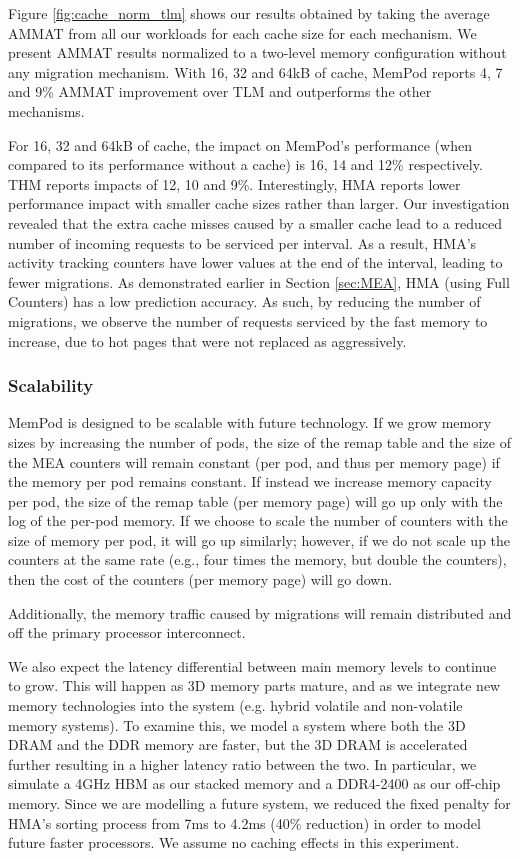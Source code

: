 Figure \ref{fig:cache_norm_tlm} shows our results obtained by taking the average AMMAT from all our workloads for each cache size for each mechanism. We present AMMAT results normalized to a two-level memory configuration without any migration mechanism. With 16, 32 and 64kB of cache, MemPod reports 4, 7 and 9\% AMMAT improvement over TLM and outperforms the other mechanisms.

For 16, 32 and 64kB of cache, the impact on MemPod's performance (when compared to its performance without a cache) is 16, 14 and 12\% respectively. THM reports impacts of 12, 10 and 9\%. Interestingly, HMA reports lower performance impact with smaller cache sizes rather than larger. Our investigation revealed that the extra cache misses caused by a smaller cache lead to a reduced number of incoming requests to be serviced per interval. As a result, HMA's activity tracking counters have lower values at the end of the interval, leading to fewer migrations. As demonstrated earlier in Section \ref{sec:MEA}, HMA (using Full Counters) has a low prediction accuracy. As such, by reducing the number of migrations, we observe the number of requests serviced by the fast memory to 
increase, due to hot pages that were not replaced as aggressively.

\subsubsection{Scalability}

MemPod is designed to be scalable with future technology.  If we grow memory
sizes by increasing the number of pods, the size of the remap table and the 
size of the MEA counters will remain constant (per pod, and thus per memory
page) if the memory per pod remains constant.  If instead we increase
memory capacity per pod, the size of the remap table (per memory page)
will go up only with the log of the per-pod memory. If we choose to scale
the number of counters with the size of memory per pod, it will go up
similarly; however, if we do not scale up the counters at the same rate
(e.g., four times the memory, but double the counters), then the cost
of the counters (per memory page) will go down.

Additionally, the memory traffic caused by migrations will remain distributed
and off the primary processor interconnect.

We also expect the latency differential between main memory levels to 
continue to grow.  This will happen as 3D memory parts mature, and as
we integrate new memory technologies into the system (e.g. hybrid
volatile and non-volatile memory systems).
To examine this, we model a system where both the 3D DRAM and the DDR memory
are faster, but the 3D DRAM is accelerated further resulting in a higher
latency ratio between the two. 
In particular, we simulate a 4GHz HBM as our stacked memory and a DDR4-2400 as our off-chip memory. Since we are modelling a future system, we reduced the fixed penalty for HMA's sorting process from 7ms to 4.2ms (40\% reduction) in order to model future faster processors.
We assume no caching effects in this experiment.

